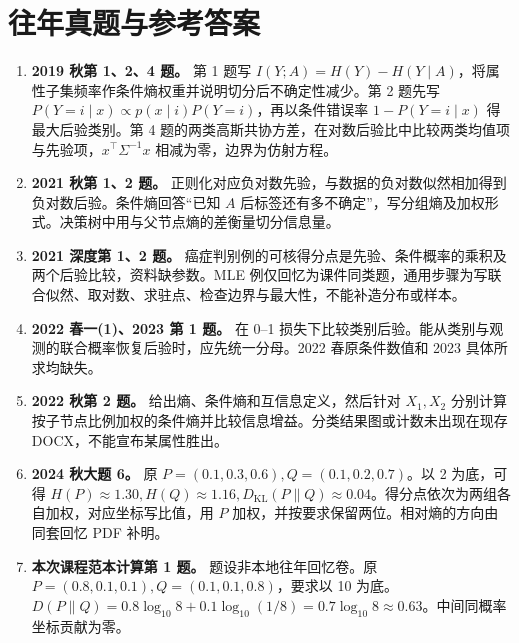 \documentclass[UTF8,a4paper,zihao=-4,fontset=fandol]{ctexrep}
\begin{document}
\section{往年真题与参考答案}
\begin{enumerate}[leftmargin=2em]
\item \textbf{2019 秋第 1、2、4 题。} 第 1 题写 \(I(Y;A)=H(Y)-H(Y\mid A)\)，将属性子集频率作条件熵权重并说明切分后不确定性减少。第 2 题先写 \(P(Y=i\mid x)\propto p(x\mid i)P(Y=i)\)，再以条件错误率 \(1-P(Y=i\mid x)\) 得最大后验类别。第 4 题的两类高斯共协方差，在对数后验比中比较两类均值项与先验项，\(x^\top\Sigma^{-1}x\) 相减为零，边界为仿射方程。
\item \textbf{2021 秋第 1、2 题。} 正则化对应负对数先验，与数据的负对数似然相加得到负对数后验。条件熵回答“已知 \(A\) 后标签还有多不确定”，写分组熵及加权形式。决策树中用与父节点熵的差衡量切分信息量。
\item \textbf{2021 深度第 1、2 题。} 癌症判别例的可核得分点是先验、条件概率的乘积及两个后验比较，资料缺参数。MLE 例仅回忆为课件同类题，通用步骤为写联合似然、取对数、求驻点、检查边界与最大性，不能补造分布或样本。
\item \textbf{2022 春一(1)、2023 第 1 题。} 在 0--1 损失下比较类别后验。能从类别与观测的联合概率恢复后验时，应先统一分母。2022 春原条件数值和 2023 具体所求均缺失。
\item \textbf{2022 秋第 2 题。} 给出熵、条件熵和互信息定义，然后针对 \(X_1,X_2\) 分别计算按子节点比例加权的条件熵并比较信息增益。分类结果图或计数未出现在现存 DOCX，不能宣布某属性胜出。
\item \textbf{2024 秋大题 6。} 原 \(P=(0.1,0.3,0.6),Q=(0.1,0.2,0.7)\)。以 2 为底，可得 \(H(P)\approx1.30,H(Q)\approx1.16,D_{\mathrm{KL}}(P\|Q)\approx0.04\)。得分点依次为两组各自加权，对应坐标写比值，用 \(P\) 加权，并按要求保留两位。相对熵的方向由同套回忆 PDF 补明。
\item \textbf{本次课程范本计算第 1 题。} 题设非本地往年回忆卷。原 \(P=(0.8,0.1,0.1),Q=(0.1,0.1,0.8)\)，要求以 10 为底。\(D(P\|Q)=0.8\log_{10}8+0.1\log_{10}(1/8)=0.7\log_{10}8\approx0.63\)。中间同概率坐标贡献为零。
\end{enumerate}
\end{document}
